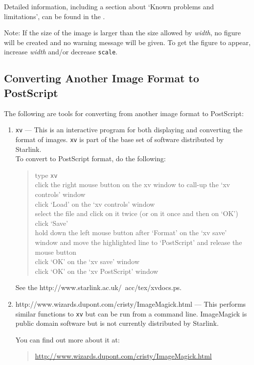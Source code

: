 \documentclass[11pt,twoside,nolof]{starlink}
\begin{document}
  Detailed information, including a section about `Known problems and
limitations', can be found in the
  \cite{floatflt}.

  Note: If the size of the image is larger than the size allowed by
\emph{width}, no figure will be created and no warning message will be
given. To get the figure to appear, increase \emph{width} and/or
decrease \texttt{scale}.


\subsection{Converting Another Image Format to PostScript}

The following are tools for converting from another image format to
PostScript:

\begin{enumerate}
  \item \texttt{xv} --- This is an interactive program for both displaying
    and converting the format of images. \texttt{xv} is part of the base set
    of software distributed by Starlink.\\
    To convert to PostScript format, do the following:
    \begin{quote}
      type \texttt{xv}\\
      click the right mouse button on the xv window to call-up the
        `xv controls' window\\
      click `Load' on the `xv controls' window\\
      select the file and click on it twice (or on it once and then on `OK')\\
      click `Save'\\
      hold down the left mouse button after `Format' on the `xv save' window
        and move the highlighted line to `PostScript' and release the mouse
        button\\
      click `OK' on the `xv save' window\\
      click `OK' on the `xv PostScript' window
    \end{quote}
    See the
    {http://www.starlink.ac.uk/~acc/tex/xvdocs.ps}\cite[section 8 `The Load Window', section 9 `The Save Window', section 10
    `The PostScript Window']{xv}.
  \item {}
    {http://www.wizards.dupont.com/cristy/ImageMagick.html}
    --- This performs similar functions to \texttt{xv} but can be run from a
    command line. ImageMagick is public domain software but is not currently
    distributed by Starlink.
    \begin{latexonly}
    You can find out more about it at:
    \begin{quote}
     \url{http://www.wizards.dupont.com/cristy/ImageMagick.html}
    \end{quote}
    \end{latexonly}
\end{enumerate}
\end{document}
